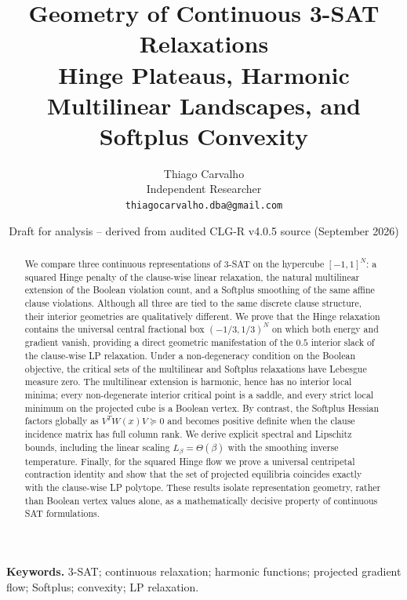 \documentclass[11pt,a4paper]{article}
\title{\textbf{Geometry of Continuous 3-SAT Relaxations}\\[0.3em]\large Hinge Plateaus, Harmonic Multilinear Landscapes, and Softplus Convexity}
\author{Thiago Carvalho\\Independent Researcher\\\texttt{thiagocarvalho.dba@gmail.com}}
\date{Draft for analysis -- derived from audited CLG-R v4.0.5 source (September 2026)}
\begin{document}
\maketitle
\begin{abstract}
We compare three continuous representations of 3-SAT on the hypercube $[-1,1]^N$: a squared Hinge penalty of the clause-wise linear relaxation, the natural multilinear extension of the Boolean violation count, and a Softplus smoothing of the same affine clause violations. Although all three are tied to the same discrete clause structure, their interior geometries are qualitatively different. We prove that the Hinge relaxation contains the universal central fractional box $(-1/3,1/3)^N$ on which both energy and gradient vanish, providing a direct geometric manifestation of the $0.5$ interior slack of the clause-wise LP relaxation. Under a non-degeneracy condition on the Boolean objective, the critical sets of the multilinear and Softplus relaxations have Lebesgue measure zero. The multilinear extension is harmonic, hence has no interior local minima; every non-degenerate interior critical point is a saddle, and every strict local minimum on the projected cube is a Boolean vertex. By contrast, the Softplus Hessian factors globally as $V^TW(x)V\succeq0$ and becomes positive definite when the clause incidence matrix has full column rank. We derive explicit spectral and Lipschitz bounds, including the linear scaling $L_\beta=\Theta(\beta)$ with the smoothing inverse temperature. Finally, for the squared Hinge flow we prove a universal centripetal contraction identity and show that the set of projected equilibria coincides exactly with the clause-wise LP polytope. These results isolate representation geometry, rather than Boolean vertex values alone, as a mathematically decisive property of continuous SAT formulations.
\end{abstract}
\noindent\textbf{Keywords.} 3-SAT; continuous relaxation; harmonic functions; projected gradient flow; Softplus; convexity; LP relaxation.
\end{document}
